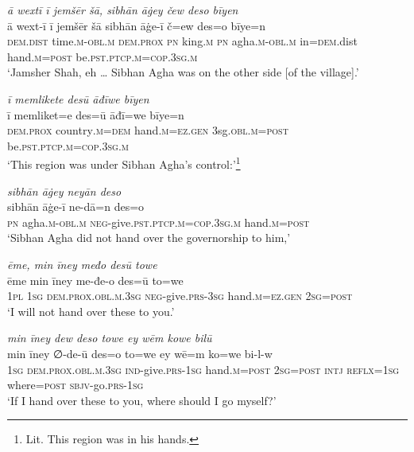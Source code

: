 \ea \label{DP.12}
\textit{ā wextī ī jemšēr šā, sibhān āġey čew deso bīyen} \\ 
\gll ā wext-ī ī jemšēr šā sibhān āġe-ī č=ew des=o bīye=n \\ 
 \textsc{dem.dist} time\textsc{.m}\textsc{-obl}\textsc{.m} \textsc{dem.prox} \textsc{pn} king\textsc{.m} \textsc{pn} agha\textsc{.m}\textsc{-obl}\textsc{.m} in\textsc{=dem}.dist hand\textsc{.m}\textsc{=\textsc{post}} be\textsc{.pst}\textsc{.ptcp}\textsc{.m}\textsc{=cop}\textsc{.3sg}\textsc{.m} \\ 
\glt `Jamsher Shah, eh … Sibhan Agha was on the other side [of the village].'
\z 
 
\ea \label{DP.14}
\textit{ī memlikete desū āđīwe bīyen} \\ 
\gll ī memliket=e des=ū āđī=we bīye=n \\ 
 \textsc{dem.prox} country\textsc{.m}\textsc{=dem} hand\textsc{.m}\textsc{=ez}\textsc{.gen} 3sg\textsc{.obl}\textsc{.m}\textsc{=\textsc{post}} be\textsc{.pst}\textsc{.ptcp}\textsc{.m}\textsc{=cop}\textsc{.3sg}\textsc{.m} \\ 
\glt `This region was under Sibhan Agha’s control:'\footnote{Lit. This region was in his hands.}
\z 
 
\ea \label{DP.19}
\textit{sibhān āġey neyān deso} \\ 
\gll sibhān āġe-ī ne-dā=n des=o \\ 
 \textsc{pn} agha\textsc{.m}\textsc{-obl}\textsc{.m} \textsc{neg-}give\textsc{.pst}\textsc{.ptcp}\textsc{.m}\textsc{=cop}\textsc{.3sg}\textsc{.m} hand\textsc{.m}\textsc{=\textsc{post}} \\ 
\glt `Sibhan Agha did not hand over the governorship to him,'
\z 
 
\ea \label{DP.22}
\textit{ēme, min īney međo desū towe} \\ 
\gll ēme min īney me-đe-o des=ū to=we \\ 
 \textsc{1pl} \textsc{1sg} \textsc{dem.prox}\textsc{.obl}\textsc{.m}\textsc{.3sg} \textsc{neg-}give\textsc{.prs}\textsc{-3sg} hand\textsc{.m}\textsc{=ez}\textsc{.gen} \textsc{2sg}\textsc{=\textsc{post}} \\ 
\glt `I will not hand over these to you.'
\z 
 
\ea \label{DP.23}
\textit{min īney dew deso towe ey wēm kowe bilū} \\ 
\gll min īney ∅-de-ū des=o to=we ey wē=m ko=we bi-l-w \\ 
 \textsc{1sg} \textsc{dem.prox}\textsc{.obl}\textsc{.m}\textsc{.3sg} \textsc{ind-}give\textsc{.prs}\textsc{-1sg} hand\textsc{.m}\textsc{=\textsc{post}} \textsc{2sg}\textsc{=\textsc{post}} \textsc{intj} \textsc{reflx}\textsc{=1sg} where\textsc{=\textsc{post}} \textsc{sbjv-}go\textsc{.prs}\textsc{-1sg} \\ 
\glt `If I hand over these to you, where should I go myself?'
\z 
 
